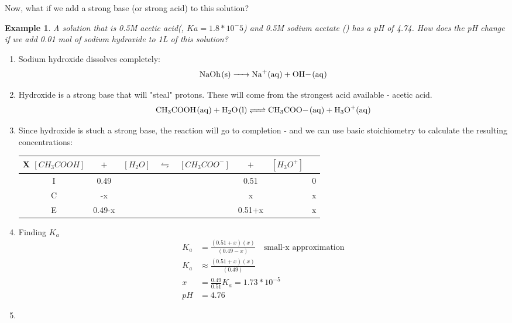 \documentclass{article}  %
\newtheorem{exmp}{Example}
\begin{document}
Now, what if we add a strong base (or strong acid) to this solution?
\begin{exmp}
    A solution that is 0.5M acetic acid(, $Ka = 1.8*10^-5$) and 0.5M sodium acetate () has a pH of 4.74. How does the pH change if we add 0.01 mol of sodium hydroxide to 1L of this solution?
\end{exmp}
\begin{enumerate}
    \item Sodium hydroxide dissolves completely:
    \begin{equation*}
        \begin{aligned}
            \ce{NaOh_(s) -> Na+_(aq) + OH-_(aq)}
        \end{aligned}
    \end{equation*}
    
    \item Hydroxide is a strong base that will "steal" protons. These will come from the strongest acid available - acetic acid.
    \begin{equation*}
        \begin{aligned}
            \ce{CH3COOH_(aq) + H2O_(l) <=> CH3COO-_(aq) + H3O+_(aq)}
        \end{aligned}
    \end{equation*}
    \item Since hydroxide is stuch a strong base, the reaction will go to completion - and we can use basic stoichiometry to calculate the resulting concentrations:
    \begin{tabular}{c|c@{}c@{}c@{}c@{}c@{}c@{}c}
        \hline
        X   $[CH_3COOH]$ & ${}+{}$ & $[H_2O]$ & ${}\leftrightharpoons{}$ & $[CH_3COO^-]$ & ${}+{}$ & $[H_3O^+]$ \\
        \hline
        I   &  0.49     &&     &&  0.51   && 0  \\
        C   &  -x       &&     &&  x   && x  \\
        E   &  0.49-x   &&     &&  0.51+x   &&  x \\      
    \end{tabular}
    \item Finding $K_a$
    \begin{equation*}
        \begin{aligned}
            K_a &= \frac{(0.51+x)(x)}{(0.49-x)} \quad \text{small-x approximation} \\
            K_a &\approx \frac{(0.51+x)(x)}{(0.49)} \\
            x &= \frac{0.49}{0.51}K_a = 1.73*10^{-5} \\
            pH &= 4.76
        \end{aligned}
    \end{equation*}
    \item 
\end{enumerate}
\end{document}
